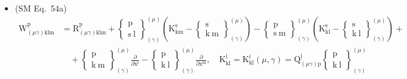 \documentclass[
    12pt,              %
    a4paper,           %
    headings=normal,   %
    twoside=true,      %
    BCOR=8mm,          %
]{scrbook}
\begin{document}
\begin{itemize}[label={},leftmargin=0pt]
    \item (SM Eq.\ 54a) 
    \[
    \begin{aligned}
    \mathrm{W}^{\underline{\mathrm{p}}}_{(\mu\gamma)\mathrm{klm}} &= \mathrm{R}^{\underline{\mathrm{p}}}_{(\mu\gamma)\mathrm{klm}} + \left\{ \begin{smallmatrix} \mathrm{p} \\ \mathrm{s\ l} \end{smallmatrix} \right\}^{(\mu)}_{(\gamma)} \left( \mathrm{K}^{\underline{\mathrm{s}}}_{\mathrm{km}} - \left\{ \begin{smallmatrix} \mathrm{s} \\ \mathrm{k\ m} \end{smallmatrix} \right\}^{(\mu)}_{(\gamma)} \right) - \left\{ \begin{smallmatrix} \mathrm{p} \\ \mathrm{s\ m} \end{smallmatrix} \right\}^{(\mu)}_{(\gamma)} \left( \mathrm{K}^{\underline{\mathrm{s}}}_{\mathrm{kl}} - \left\{ \begin{smallmatrix} \mathrm{s} \\ \mathrm{k\ l} \end{smallmatrix} \right\}^{(\mu)}_{(\gamma)} \right) + \\
    &\quad + \left\{ \begin{smallmatrix} \mathrm{p} \\ \mathrm{k\ m} \end{smallmatrix} \right\}^{(\mu)}_{(\gamma)} \frac{\partial}{\partial \mathrm{x}^{\underline{\mathrm{l}}}} - \left\{ \begin{smallmatrix} \mathrm{p} \\ \mathrm{k\ l} \end{smallmatrix} \right\}^{(\mu)}_{(\gamma)} \frac{\partial}{\partial \mathrm{x}^{\underline{\mathrm{m}}}}, \quad \mathrm{K}^{\underline{\mathrm{i}}}_{\mathrm{kl}} = \mathrm{K}^\mathrm{i}_{\mathrm{kl}}(\mu, \gamma) = \mathrm{Q}^{\underline{\mathrm{i}}}_{(\mu\gamma)\mathrm{p}} \left\{ \begin{smallmatrix} \mathrm{p} \\ \mathrm{k\ l} \end{smallmatrix} \right\}^{(\mu)}_{(\gamma)}
    \end{aligned}
    \]


\end{itemize}
\end{document}
